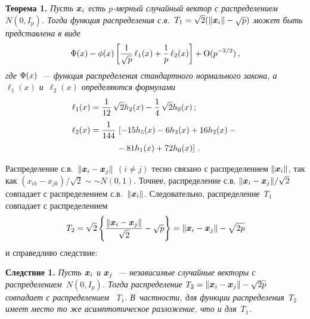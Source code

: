 \begin{multicols}{2}
\noindent
\textbf{Теорема 1.} %
\textit{Пусть $\mbox{\boldmath{$x$}}_i$ есть $p$-мерный случайный вектор с распределением~$N(0,I_p)$.
Тогда функция распределения с.в.\ $T_1 = \sqrt 2(\|\mbox{\boldmath{$x$}}_i\| -\sqrt{p})$ может быть представлена в виде}
\begin{equation*}
\mbox{$\Phi$}(x) -\mbox{$\phi$}(x)\left[\displaystyle\frac{\displaystyle 1\mathstrut}{\displaystyle \sqrt p\mathstrut}\, \ell_1(x) + \displaystyle\frac{\displaystyle 1\mathstrut}{\displaystyle p\mathstrut}\,\ell_2(x) \right] + \mbox{\rm O}(p^{-3/2})\,,
\end{equation*}
\textit{где $\mbox{$\Phi$}(x)$~--- функция распределения стандартного нормального закона, а $\ell_1(x)$ и~$\ell_2(x)$ 
определяются формулами}
\begin{align*}
\ell_1(x) &= \fr{1}{12}\,\sqrt{2}h_2(x) - \fr{1}{4}\,\sqrt{2}h_0(x)\,;\\
\ell_2(x) &=\fr{1}{144}\,\left[  -15 h_5(x) -6 h_3(x) + 16 h_2(x) -{}\right.\\
&\hspace*{10mm}\left.{}- 81 h_1(x) + 72h_0(x)\right]\,.
\end{align*}


Распределение с.в.\
$\| \mbox{\boldmath{$x$}}_i - \mbox{\boldmath{$x$}}_j \|$ $(i \neq j)$ тесно связано с распределением
$\| \mbox{\boldmath{$x$}}_i \|$, так как $(x_{ik} - x_{jk})/\sqrt{2}\sim$\linebreak $ \sim N(0,1)$. Точнее, распределение 
с.в. $\| \mbox{\boldmath{$x$}}_i - \mbox{\boldmath{$x$}}_j \|/\sqrt{2}$ совпадает с распределением с.в.~$\| \mbox{\boldmath{$x$}}_i \|$. 
Следовательно, распределение~$T_1$ совпадает с распределением
\begin{equation*}
T_2 = \sqrt{2}\left\{\displaystyle\frac{\displaystyle \| \mbox{\boldmath{$x$}}_i - \mbox{\boldmath{$x$}}_j \|\mathstrut}{\displaystyle \sqrt{2}\mathstrut}-\sqrt{p}\right\}
=\| \mbox{\boldmath{$x$}}_i - \mbox{\boldmath{$x$}}_j \|-\sqrt{2p}
\end{equation*}
и справедливо следствие:

\medskip

\noindent
\textbf{Следствие 1.} %
\textit{Пусть $\mbox{\boldmath{$x$}}_i$ и $\mbox{\boldmath{$x$}}_j$~--- независимые случайные векторы с распределением~$N(0,I_p)$.
Тогда распределение $T_2 =\| \mbox{\boldmath{$x$}}_i - \mbox{\boldmath{$x$}}_j \| -\sqrt{2p}$ совпадает с распределением~ $T_1$. 
В~частности, для функции распределения~$T_2$  имеет место то же асимптотическое разложение, что и для~$T_1$.}
\medskip


\end{multicols}
